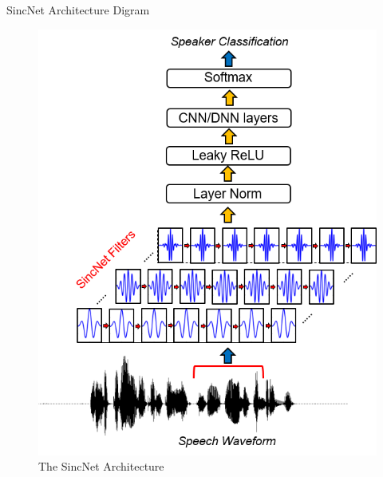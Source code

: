 \documentclass[notheorems, aspectratio=54]{beamer}
\begin{document}
\begin{frame}{SincNet Architecture Digram}
	\begin{figure}[H]
		\includegraphics[width=0.4\linewidth]{images/SincNet.png}
		\caption{The SincNet Architecture}
		\label{fig:writing-thesis}
	\end{figure}
\end{frame}
\end{document}
